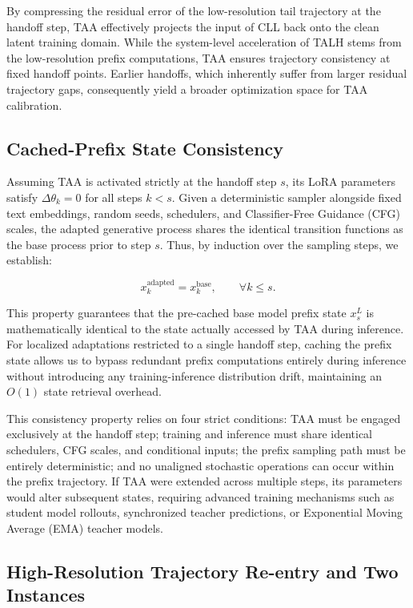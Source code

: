 By compressing the residual error of the low-resolution tail trajectory
at the handoff step, TAA effectively projects the input of CLL back onto
the clean latent training domain. While the system-level acceleration of
TALH stems from the low-resolution prefix computations, TAA ensures
trajectory consistency at fixed handoff points. Earlier handoffs, which
inherently suffer from larger residual trajectory gaps, consequently
yield a broader optimization space for TAA calibration.

\subsection{Cached-Prefix State Consistency}
\label{sec:cached}

Assuming TAA is activated strictly at the handoff step \(s\), its LoRA
parameters satisfy \(\Delta\theta_k=0\) for all steps \(k < s\). Given a
deterministic sampler alongside fixed text embeddings, random seeds,
schedulers, and Classifier-Free Guidance (CFG) scales, the adapted
generative process shares the identical transition functions as the base
process prior to step \(s\). Thus, by induction over the sampling steps,
we establish:

\[
x_k^{\mathrm{adapted}}=x_k^{\mathrm{base}},
\qquad \forall k\leq s.
\]

This property guarantees that the pre-cached base model prefix state
\(x_s^L\) is mathematically identical to the state actually accessed by
TAA during inference. For localized adaptations restricted to a single
handoff step, caching the prefix state allows us to bypass redundant
prefix computations entirely during inference without introducing any
training-inference distribution drift, maintaining an \(O(1)\) state
retrieval overhead.

This consistency property relies on four strict conditions: TAA must be
engaged exclusively at the handoff step; training and inference must
share identical schedulers, CFG scales, and conditional inputs; the
prefix sampling path must be entirely deterministic; and no unaligned
stochastic operations can occur within the prefix trajectory. If TAA
were extended across multiple steps, its parameters would alter
subsequent states, requiring advanced training mechanisms such as
student model rollouts, synchronized teacher predictions, or Exponential
Moving Average (EMA) teacher models.

\subsection{High-Resolution Trajectory Re-entry and Two Instances}

